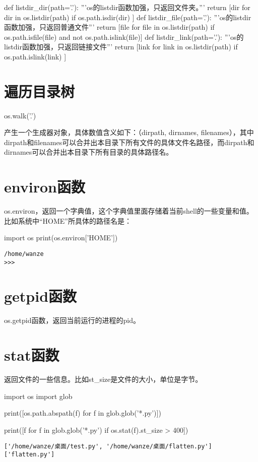 \documentclass[12pt,oneside]{book}
\begin{document}
\begin{common-format}
\begin{tcbpython}[]
def listdir_dir(path='.'):
    '''os的listdir函数加强，只返回文件夹。'''
    return [dir for dir in os.listdir(path) if os.path.isdir(dir) ]
def listdir_file(path='.'):
    '''os的listdir函数加强，只返回普通文件'''
    return [file for file in os.listdir(path) if os.path.isfile(file)
     and  not os.path.islink(file)]
def listdir_link(path='.'):
    '''os的listdir函数加强，只返回链接文件'''
    return [link for link in os.listdir(path) if os.path.islink(link) ]
\end{tcbpython}




\section{遍历目录树}
\begin{tcbpython}[]
os.walk('.')
\end{tcbpython}

产生一个生成器对象，具体数值含义如下：（dirpath, dirnames, filenames），其中dirpath和filenames可以合并出本目录下所有文件的具体文件名路径，而dirpath和dirnames可以合并出本目录下所有目录的具体路径名。

\section{environ函数}
os.environ，返回一个字典值，这个字典值里面存储着当前shell的一些变量和值。比如系统中“HOME”所具体的路径名是：
\begin{tcbpython}[]
import os
print(os.environ['HOME'])
\end{tcbpython}
\begin{Verbatim}
/home/wanze
>>> 
\end{Verbatim}

\section{getpid函数}
os.getpid函数，返回当前运行的进程的pid。

\section{stat函数}
返回文件的一些信息。比如st\_{}size是文件的大小，单位是字节。

\begin{tcbpython}[]
import os
import glob

print([os.path.abspath(f) for f in glob.glob('*.py')])

print([f for f in glob.glob('*.py') if os.stat(f).st_size > 400])
\end{tcbpython}
\begin{Verbatim}
['/home/wanze/桌面/test.py', '/home/wanze/桌面/flatten.py']
['flatten.py']
\end{Verbatim}


\end{common-format}
\end{document}
